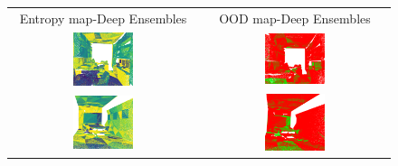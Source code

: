     \begin{figure}[h!]
        \centering
        \begin{tabular}{cc}
            Entropy map-Deep Ensembles & OOD map-Deep Ensembles \\
            \includegraphics[width=0.33\textwidth, height=0.18\textheight]{images/ood_imgs/de_s3dis/ofc_3_de_ent.pdf}& 
            \includegraphics[width=0.33\textwidth, height=0.18\textheight]{images/ood_imgs/de_s3dis/de_ent_2.pdf}\\

            \includegraphics[width=0.33\textwidth, height=0.18\textheight]{images/ood_imgs/de_s3dis/cf1_de_ent.pdf}& 
            \includegraphics[width=0.33\textwidth, height=0.18\textheight]{images/ood_imgs/de_s3dis/de_ent_4.pdf}\\


\end{tabular}
\end{figure}
